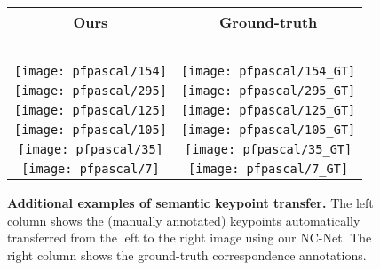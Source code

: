 \documentclass{article}
\begin{document}
\begin{figure}[tbp]
  \centering
  \begingroup
  \renewcommand{\arraystretch}{0.5}
  \begin{tabular}{@{\hskip 1pt}c@{\hskip 6pt}|@{\hskip 6pt}c@{\hskip 1pt}}
    Ours & Ground-truth \\ \hline
    ~ & ~ \\
\texttt{[image: pfpascal/154]}  & 
\texttt{[image: pfpascal/154\_GT]} \\
\texttt{[image: pfpascal/295]}  & 
\texttt{[image: pfpascal/295\_GT]} \\
\texttt{[image: pfpascal/125]}  & 
\texttt{[image: pfpascal/125\_GT]} \\
\texttt{[image: pfpascal/105]}  & 
\texttt{[image: pfpascal/105\_GT]} \\
\texttt{[image: pfpascal/35]}  & 
\texttt{[image: pfpascal/35\_GT]} \\
\texttt{[image: pfpascal/7]}  & 
\texttt{[image: pfpascal/7\_GT]} \\


  \end{tabular}
  \endgroup
  \vspace{2pt}
  \caption{{\bf Additional examples of semantic  keypoint  transfer.} The left column shows the (manually annotated) keypoints automatically transferred from the left to the right image using our NC-Net. The right column shows the ground-truth correspondence annotations.}
  \label{fig:qualPascal}
\end{figure}
\end{document}
